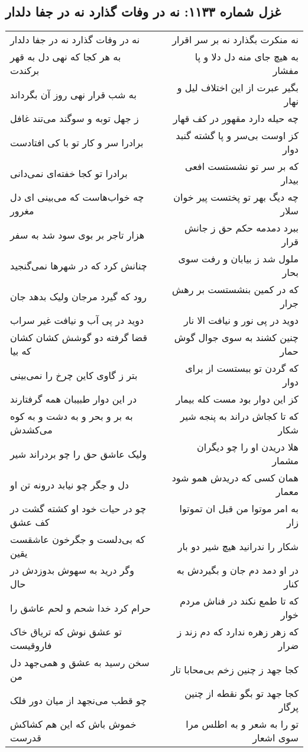 \begin{center}
\section*{غزل شماره ۱۱۳۳: نه در وفات گذارد نه در جفا دلدار}
\label{sec:1133}
\begin{longtable}{l p{0.5cm} r}
نه در وفات گذارد نه در جفا دلدار
&&
نه منکرت بگذارد نه بر سر اقرار
\\
به هر کجا که نهی دل به قهر برکندت
&&
به هیچ جای منه دل دلا و پا مفشار
\\
به شب قرار نهی روز آن بگرداند
&&
بگیر عبرت از این اختلاف لیل و نهار
\\
ز جهل توبه و سوگند می‌تند غافل
&&
چه حیله دارد مقهور در کف قهار
\\
برادرا سر و کار تو با کی افتادست
&&
کز اوست بی‌سر و پا گشته گنبد دوار
\\
برادرا تو کجا خفته‌ای نمی‌دانی
&&
که بر سر تو نشستست افعی بیدار
\\
چه خواب‌هاست که می‌بینی ای دل مغرور
&&
چه دیگ بهر تو پختست پیر خوان سلار
\\
هزار تاجر بر بوی سود شد به سفر
&&
ببرد دمدمه حکم حق ز جانش قرار
\\
چنانش کرد که در شهرها نمی‌گنجید
&&
ملول شد ز بیابان و رفت سوی بحار
\\
رود که گیرد مرجان ولیک بدهد جان
&&
که در کمین بنشستست بر رهش جرار
\\
دوید در پی آب و نیافت غیر سراب
&&
دوید در پی نور و نیافت الا نار
\\
قضا گرفته دو گوشش کشان کشان که بیا
&&
چنین کشند به سوی جوال گوش حمار
\\
بتر ز گاوی کاین چرخ را نمی‌بینی
&&
که گردن تو ببستست از برای دوار
\\
در این دوار طبیبان همه گرفتارند
&&
کز این دوار بود مست کله بیمار
\\
به بر و بحر و به دشت و به کوه می‌کشدش
&&
که تا کجاش دراند به پنجه شیر شکار
\\
ولیک عاشق حق را چو بردراند شیر
&&
هلا دریدن او را چو دیگران مشمار
\\
دل و جگر چو نیابد درونه تن او
&&
همان کسی که دریدش همو شود معمار
\\
چو در حیات خود او کشته گشت در کف عشق
&&
به امر موتوا من قبل ان تموتوا زار
\\
که بی‌دلست و جگرخون عاشقست یقین
&&
شکار را ندرانید هیچ شیر دو بار
\\
وگر درید به سهوش بدوزدش در حال
&&
در او دمد دم جان و بگیردش به کنار
\\
حرام کرد خدا شحم و لحم عاشق را
&&
که تا طمع نکند در فناش مردم خوار
\\
تو عشق نوش که تریاق خاک فاروقیست
&&
که زهر زهره ندارد که دم زند ز ضرار
\\
سخن رسید به عشق و همی‌جهد دل من
&&
کجا جهد ز چنین زخم بی‌محابا تار
\\
چو قطب می‌نجهد از میان دور فلک
&&
کجا جهد تو بگو نقطه از چنین پرگار
\\
خموش باش که این هم کشاکش قدرست
&&
تو را به شعر و به اطلس مرا سوی اشعار
\\
\end{longtable}
\end{center}
